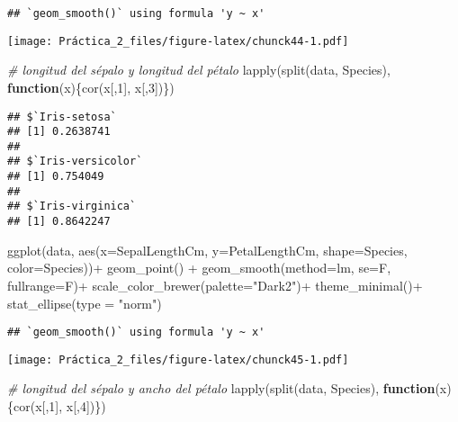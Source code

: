 \documentclass[
]{article}
\newenvironment{Shaded}{\begin{snugshade}}{\end{snugshade}}
\newcommand{\AttributeTok}[1]{\textcolor[rgb]{0.77,0.63,0.00}{#1}}
\newcommand{\CommentTok}[1]{\textcolor[rgb]{0.56,0.35,0.01}{\textit{#1}}}
\newcommand{\ControlFlowTok}[1]{\textcolor[rgb]{0.13,0.29,0.53}{\textbf{#1}}}
\newcommand{\DecValTok}[1]{\textcolor[rgb]{0.00,0.00,0.81}{#1}}
\newcommand{\FunctionTok}[1]{\textcolor[rgb]{0.00,0.00,0.00}{#1}}
\newcommand{\NormalTok}[1]{#1}
\newcommand{\SpecialCharTok}[1]{\textcolor[rgb]{0.00,0.00,0.00}{#1}}
\newcommand{\StringTok}[1]{\textcolor[rgb]{0.31,0.60,0.02}{#1}}
\begin{document}
\begin{verbatim}
## `geom_smooth()` using formula 'y ~ x'
\end{verbatim}

\texttt{[image: Práctica\_2\_files/figure-latex/chunck44-1.pdf]}

\begin{Shaded}
\begin{Highlighting}[]
\CommentTok{\# longitud del sépalo y longitud del pétalo}
\FunctionTok{lapply}\NormalTok{(}\FunctionTok{split}\NormalTok{(data, Species), }\ControlFlowTok{function}\NormalTok{(x)\{}\FunctionTok{cor}\NormalTok{(x[,}\DecValTok{1}\NormalTok{], x[,}\DecValTok{3}\NormalTok{])\})}
\end{Highlighting}
\end{Shaded}

\begin{verbatim}
## $`Iris-setosa`
## [1] 0.2638741
## 
## $`Iris-versicolor`
## [1] 0.754049
## 
## $`Iris-virginica`
## [1] 0.8642247
\end{verbatim}

\begin{Shaded}
\begin{Highlighting}[]
\FunctionTok{ggplot}\NormalTok{(data, }\FunctionTok{aes}\NormalTok{(}\AttributeTok{x=}\NormalTok{SepalLengthCm, }\AttributeTok{y=}\NormalTok{PetalLengthCm, }\AttributeTok{shape=}\NormalTok{Species, }\AttributeTok{color=}\NormalTok{Species))}\SpecialCharTok{+}
  \FunctionTok{geom\_point}\NormalTok{() }\SpecialCharTok{+}
  \FunctionTok{geom\_smooth}\NormalTok{(}\AttributeTok{method=}\NormalTok{lm, }\AttributeTok{se=}\NormalTok{F, }\AttributeTok{fullrange=}\NormalTok{F)}\SpecialCharTok{+}
  \FunctionTok{scale\_color\_brewer}\NormalTok{(}\AttributeTok{palette=}\StringTok{"Dark2"}\NormalTok{)}\SpecialCharTok{+}
  \FunctionTok{theme\_minimal}\NormalTok{()}\SpecialCharTok{+}
  \FunctionTok{stat\_ellipse}\NormalTok{(}\AttributeTok{type =} \StringTok{"norm"}\NormalTok{)}
\end{Highlighting}
\end{Shaded}

\begin{verbatim}
## `geom_smooth()` using formula 'y ~ x'
\end{verbatim}

\texttt{[image: Práctica\_2\_files/figure-latex/chunck45-1.pdf]}

\begin{Shaded}
\begin{Highlighting}[]
\CommentTok{\# longitud del sépalo y ancho del pétalo }
\FunctionTok{lapply}\NormalTok{(}\FunctionTok{split}\NormalTok{(data, Species), }\ControlFlowTok{function}\NormalTok{(x)\{}\FunctionTok{cor}\NormalTok{(x[,}\DecValTok{1}\NormalTok{], x[,}\DecValTok{4}\NormalTok{])\})}
\end{Highlighting}
\end{Shaded}
\end{document}
